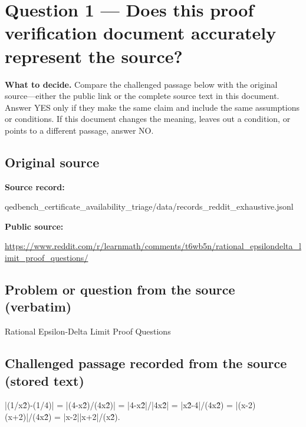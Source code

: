 \documentclass[11pt]{article}
\begin{document}
\section*{Question 1 --- Does this proof verification document accurately represent the source?}
\textbf{What to decide.} Compare the challenged passage below with the original source---either the public link or the complete source text in this document. Answer YES only if they make the same claim and include the same assumptions or conditions. If this document changes the meaning, leaves out a condition, or points to a different passage, answer NO.
\subsection*{Original source}
\textbf{Source record:}
\begin{Vsrc}
qedbench_certificate_availability_triage/data/records_reddit_exhaustive.jsonl
\end{Vsrc}
\textbf{Public source:}\par
\url{https://www.reddit.com/r/learnmath/comments/t6wb5n/rational_epsilondelta_limit_proof_questions/}\par
\subsection*{Problem or question from the source (verbatim)}
\begin{Vsrc}
Rational Epsilon-Delta Limit Proof Questions
\end{Vsrc}
\subsection*{Challenged passage recorded from the source (stored text)}
\begin{Vsrc}
|(1/x\^2)-(1/4)| = |(4-x\^2)/(4x\^2)| = |4-x\^2|/|4x\^2| = |x\^2-4|/(4x\^2) = |(x-2)(x+2)|/(4x\^2) = |x-2||x+2|/(x\^2).
\end{Vsrc}
\end{document}
